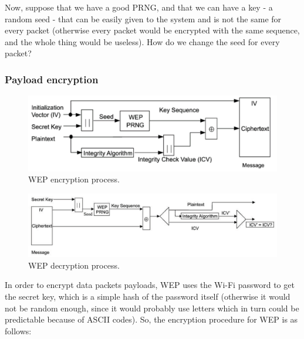 Now, suppose that we have a good PRNG, and that we can have a key - a random seed - that can be easily given to the system and is not the same for every packet (otherwise every packet would be encrypted with the same sequence, and the whole thing would be useless). How do we change the seed for every packet?


\subsubsection{Payload encryption}

\begin{figure}[h]
    \centering
    \includegraphics[scale=0.5]{img/wifi_wep_encryption.png}
    \decoRule
    \caption{WEP encryption process.}
    \label{fig:wifi_wep_encryption}
\end{figure}

\begin{figure}[h]
    \centering
    \includegraphics[scale=0.45]{img/wifi_wep_decryption.png}
    \decoRule
    \caption{WEP decryption process.}
    \label{fig:wifi_wep_decryption}
\end{figure}

In order to encrypt data packets payloads, WEP uses the Wi-Fi password to get the secret key, which is a simple hash of the password itself (otherwise it would not be random enough, since it would probably use letters which in turn could be predictable because of ASCII codes). So, the encryption procedure for WEP is as follows:

